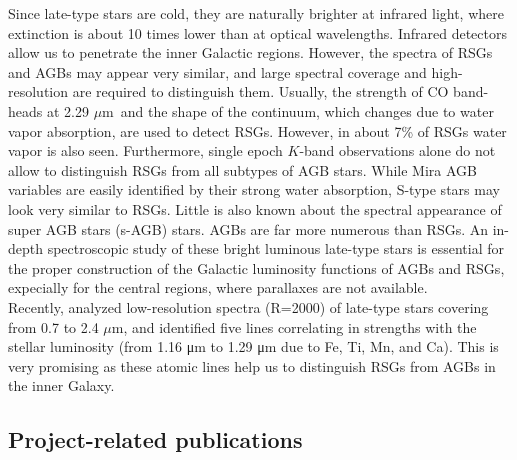 \documentclass[final,11pt,onecolumn,a4paper,twoside]{scrbook_gj}
\newcommand{\um}{$\mu$m}
\begin{document}
Since late-type stars are cold,  
they are naturally brighter at infrared light, where 
extinction  is about 10 times lower than 
at optical wavelengths.  
Infrared detectors allow us to  penetrate 
the inner Galactic regions.
However, the spectra of RSGs and AGBs may appear very similar,
and large spectral coverage and high-resolution are required to
distinguish them. 
Usually, the strength of CO band-heads at 2.29 \um\ and  
the shape of the continuum, which 
changes due to  water vapor absorption, are used
to detect RSGs. However, 
in about 7\% of RSGs water vapor is also seen.
Furthermore, single epoch $K$-band observations 
alone  do not allow to distinguish RSGs from all subtypes of AGB stars.
While Mira AGB variables are easily identified by their strong water
absorption, S-type stars   may look very similar  to RSGs. 
Little is also known about the spectral appearance of 
super AGB stars (s-AGB) stars.
AGBs  are far more numerous
than  RSGs. An in-depth spectroscopic study of these bright 
luminous late-type stars is essential 
for the proper construction of the Galactic
luminosity functions of AGBs and RSGs, expecially 
for the central regions,
where parallaxes are not available.\\
Recently, \citet{messineo21} analyzed low-resolution spectra 
(R=2000) of late-type stars covering from 0.7 to 
2.4 \um, 
and identified five lines correlating in strengths 
with the stellar luminosity (from 1.16 μm to 1.29 μm 
due to  Fe, Ti, Mn, and Ca). This is very promising  
as these atomic lines help us 
to distinguish RSGs from AGBs in the inner Galaxy. 
 







\subsection{Project-related publications}
\end{document}
